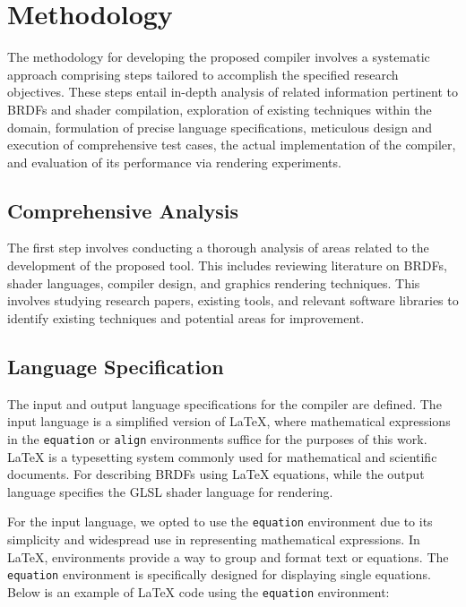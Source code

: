 \documentclass[english, 
               brazil, 
               bsc] %
               {dcomp-abntex2}
\begin{document}
\chapter{Methodology}

The methodology for developing the proposed compiler involves a systematic approach comprising steps tailored to accomplish the specified research objectives. These steps entail in-depth analysis of related information pertinent to BRDFs and shader compilation, exploration of existing techniques within the domain, formulation of precise language specifications, meticulous design and execution of comprehensive test cases, the actual implementation of the compiler, and evaluation of its performance via rendering experiments.

\section{Comprehensive Analysis}

The first step involves conducting a thorough analysis of areas related to the development of the proposed tool. This includes reviewing literature on BRDFs, shader languages, compiler design, and graphics rendering techniques. This involves studying research papers, existing tools, and relevant software libraries to identify existing techniques and potential areas for improvement.

\section{Language Specification}

The input and output language specifications for the compiler are defined. The input language is a simplified version of LaTeX, where mathematical expressions in the \texttt{equation} or \texttt{align} environments suffice for the purposes of this work. LaTeX is a typesetting system commonly used for mathematical and scientific documents. For describing BRDFs using LaTeX equations, while the output language specifies the GLSL shader language for rendering.

For the input language, we opted to use the \texttt{equation} environment due to its simplicity and widespread use in representing mathematical expressions. In LaTeX, environments provide a way to group and format text or equations. The \texttt{equation} environment is specifically designed for displaying single equations. Below is an example of LaTeX code using the \texttt{equation} environment:
\end{document}
